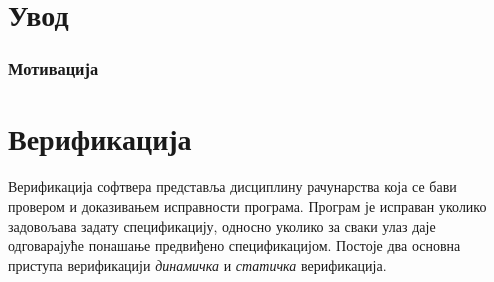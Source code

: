 \documentclass[12pt,oneside]{memoir}
\begin{document}
\frontmatter
\naslovna
\komisija
\apstrakt
\mainmatter
\tableofcontents





\chapter{Увод} 
\subsection{Мотивација}

\chapter{Верификација}
	Верификација софтвера представља дисциплину рачунарства која се бави провером и доказивањем исправности програма. Програм је исправан уколико задовољава задату спецификацију, односно уколико за сваки улаз даје одговарајуће понашање предвиђено спецификацијом. Постоје два основна приступа верификацији \emph{динамичка} и \emph{статичка} верификација.
\end{document}

